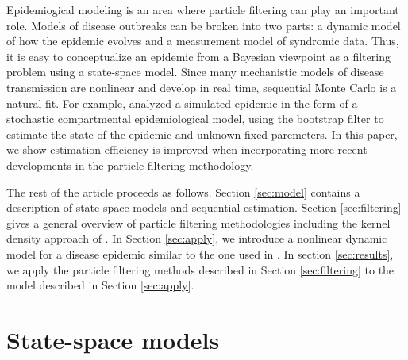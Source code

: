 \documentclass[useAMS,referee,usenatbib]{biom}
\begin{document}
Epidemiogical modeling is an area where particle filtering can play an important role.  Models of disease outbreaks can be broken into two parts: a dynamic model of how the epidemic evolves and a measurement model of syndromic data.  Thus, it is easy to conceptualize an epidemic from a Bayesian viewpoint as a filtering problem using a state-space model.  Since many mechanistic models of disease transmission are nonlinear and develop in real time, sequential Monte Carlo is a natural fit. For example, \citet{skvortsov2012monitoring} analyzed a simulated epidemic in the form of a stochastic compartmental epidemiological model, using the bootstrap filter to estimate the state of the epidemic and unknown fixed paremeters.  In this paper, we show estimation efficiency is improved when incorporating more recent developments in the particle filtering methodology.

The rest of the article proceeds as follows. Section \ref{sec:model} contains a description of state-space models and sequential estimation. Section \ref{sec:filtering} gives a general overview of particle filtering methodologies including the kernel density approach of \cite{Liu:West:comb:2001}.  In Section \ref{sec:apply}, we introduce a nonlinear dynamic model for a disease epidemic similar to the one used in \citet{skvortsov2012monitoring}. In section \ref{sec:results}, we apply the particle filtering methods described in Section \ref{sec:filtering} to the model described in Section \ref{sec:apply}.  %

\section{State-space models \label{sec:model}}
\end{document}

